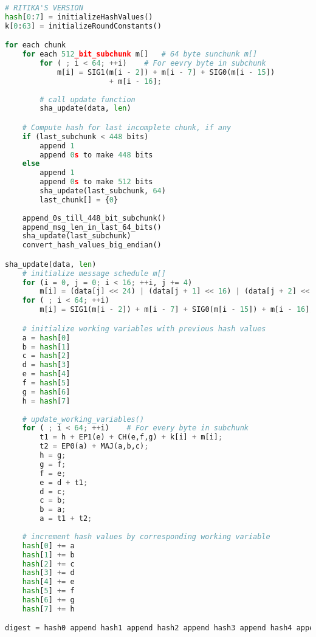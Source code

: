 \documentclass{article}
\begin{document}
\begin{enumerate}
\begin{enumerate}[label=(\alph*)]
\begin{enumerate}[label=(\roman*)]
\begin{lstlisting}[language=python]
# RITIKA'S VERSION
hash[0:7] = initializeHashValues()
k[0:63] = initializeRoundConstants()

for each chunk
	for each 512_bit_subchunk m[]	# 64 byte sunchunk m[]
		for ( ; i < 64; ++i)	# For eevry byte in subchunk
			m[i] = SIG1(m[i - 2]) + m[i - 7] + SIG0(m[i - 15]) 
						+ m[i - 16];
		
		# call update function
		sha_update(data, len)

	# Compute hash for last incomplete chunk, if any
	if (last_subchunk < 448 bits)
		append 1
		append 0s to make 448 bits
	else
		append 1
		append 0s to make 512 bits
		sha_update(last_subchunk, 64)
		last_chunk[] = {0}
		
	append_0s_till_448_bit_subchunk()
	append_msg_len_in_last_64_bits()
	sha_update(last_subchunk)
	convert_hash_values_big_endian()		

sha_update(data, len)
	# initialize message schedule m[]
	for (i = 0, j = 0; i < 16; ++i, j += 4)
		m[i] = (data[j] << 24) | (data[j + 1] << 16) | (data[j + 2] << 8) | (data[j + 3]);
	for ( ; i < 64; ++i)
		m[i] = SIG1(m[i - 2]) + m[i - 7] + SIG0(m[i - 15]) + m[i - 16];

	# initialize working variables with previous hash values
	a = hash[0]
	b = hash[1]
	c = hash[2]
	d = hash[3]
	e = hash[4]
	f = hash[5]
	g = hash[6]
	h = hash[7]
		
	# update_working_variables()
	for ( ; i < 64; ++i)	# For every byte in subchunk
		t1 = h + EP1(e) + CH(e,f,g) + k[i] + m[i];
		t2 = EP0(a) + MAJ(a,b,c);
		h = g;
		g = f;
		f = e;
		e = d + t1;
		d = c;
		c = b;
		b = a;
		a = t1 + t2;
		
	# increment hash values by corresponding working variable
	hash[0] += a	
	hash[1] += b
	hash[2] += c
	hash[3] += d	
	hash[4] += e
	hash[5] += f
	hash[6] += g	
	hash[7] += h

digest = hash0 append hash1 append hash2 append hash3 append hash4 append hash5 append hash6 append hash7


\end{lstlisting}
\end{enumerate}
\end{enumerate}
\end{enumerate}
\end{document}
